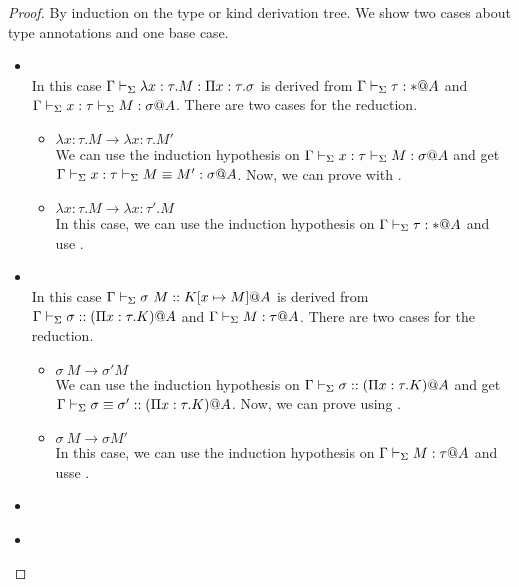 \begin{proof}
    By induction on the type or kind derivation tree. We show two cases about
    type annotations and one base case.
    \begin{itemize}
        \item \TAbs \\
            In this case \( \Gamma \vdash_\Sigma \lambda x:\tau.M : \Pi x:\tau.\sigma \) is
            derived from \( \Gamma \vdash_\Sigma \tau : * @A \) and \( \Gamma \vdash_\Sigma x:\tau \vdash_\Sigma M :
            \sigma @ A \). There are two cases for the reduction.
            \begin{itemize}
                \item \( \lambda x:\tau.M \longrightarrow \lambda x:\tau.M' \) \\
                    We can use the induction hypothesis on \( \Gamma \vdash_\Sigma x:\tau \vdash_\Sigma M
                    : \sigma @ A \) and get \( \Gamma \vdash_\Sigma x:\tau \vdash_\Sigma M \equiv M' : \sigma
                    @ A \). Now, we can prove with \QAbs.
                \item \( \lambda x:\tau.M \longrightarrow \lambda x:\tau'.M \) \\
                    In this case, we can use the induction hypothesis on \( \Gamma
                    \vdash_\Sigma \tau : * @A \) and use \QAbs.
            \end{itemize}
        \item \KApp \\
            In this case \( \Gamma \vdash_\Sigma \sigma\ M::K[x\mapsto M]@A \) is derived from \( \Gamma\vdash_\Sigma \sigma:: (\Pi x:\tau.K)@A \) and \( \G\V M:\tau@A \). There are two cases for the reduction.
            \begin{itemize}
                \item \( \sigma\ M \longrightarrow \sigma' M \) \\
                    We can use  the induction hypothesis on \( \Gamma\vdash_\Sigma \sigma ::
                    (\Pi x:\tau.K)@A \) and get \( \Gamma \vdash_\Sigma \sigma \equiv \sigma' ::
                    (\Pi x:\tau.K)@A \). Now, we can prove using \QTApp.
                \item \( \sigma\ M \longrightarrow \sigma M' \) \\
                    In this case, we can use the induction hypothesis on \(
                    \G\V M:\tau@A \) and usse \QTApp.
            \end{itemize}
        \item \TApp \\
        \item \TTBL \\

\end{itemize}
\end{proof}
